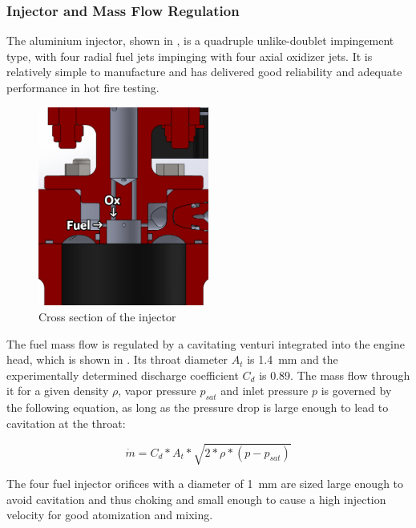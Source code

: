 \subsubsection{Injector and Mass Flow Regulation}\label{sec:prop_injector}

The aluminium injector, shown in , is a quadruple unlike-doublet impingement type, with four radial fuel jets impinging with four axial oxidizer jets. It is relatively simple to manufacture and has delivered good reliability and adequate performance in hot fire testing.

\begin{figure}[H]
\centering
\includegraphics[width=0.5\textwidth]{Propulsion/injector_cut.png}
\caption{Cross section of the injector}
\label{fig:sysarch_injCut}
\end{figure}

The fuel mass flow is regulated by a cavitating venturi integrated into the engine head, which is shown in . Its throat diameter $A_t$ is \SI{1.4}{\milli\meter} and the experimentally determined discharge coefficient $C_d$ is 0.89. The mass flow through it for a given density $\rho$, vapor pressure $p_{sat}$ and inlet pressure $p$ is governed by the following equation, as long as the pressure drop is large enough to lead to cavitation at the throat:

\begin{equation}
\dot{m} = C_d * A_t * \sqrt{2 * \rho * (p - p_{sat})}
\end{equation}

The four fuel injector orifices with a diameter of \SI{1}{\milli\meter} are sized large enough to avoid cavitation and thus choking and small enough to cause a high injection velocity for good atomization and mixing.

